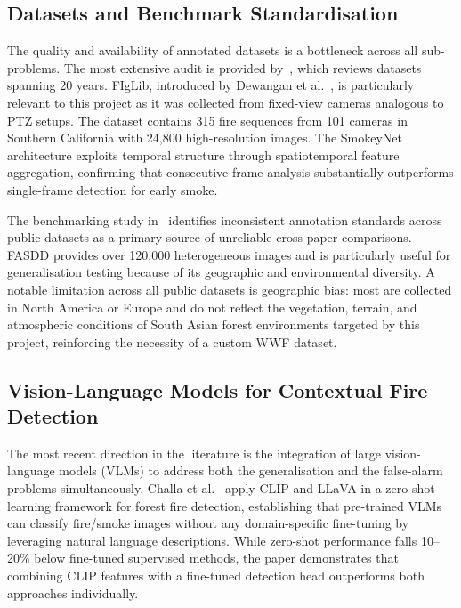 \documentclass[11pt,twocolumn]{article}
\begin{document}
\subsection{Datasets and Benchmark Standardisation}

The quality and availability of annotated datasets is a bottleneck
across all sub-problems. The most extensive audit is provided
by~\cite{datasets20years}, which reviews datasets spanning 20 years.
FIgLib, introduced by Dewangan et al.~\cite{figlib2022}, is
particularly relevant to this project as it was collected from
fixed-view cameras analogous to PTZ setups. The dataset contains
315 fire sequences from 101 cameras in Southern California with
24,800 high-resolution images. The SmokeyNet architecture exploits
temporal structure through spatiotemporal feature aggregation,
confirming that consecutive-frame analysis substantially outperforms
single-frame detection for early smoke.

The benchmarking study in~\cite{benchmarking2024} identifies
inconsistent annotation standards across public datasets as a primary
source of unreliable cross-paper comparisons. FASDD provides over
120,000 heterogeneous images and is particularly useful for
generalisation testing because of its geographic and environmental
diversity. A notable limitation across all public datasets is
geographic bias: most are collected in North America or Europe and
do not reflect the vegetation, terrain, and atmospheric conditions
of South Asian forest environments targeted by this project,
reinforcing the necessity of a custom WWF dataset.

\subsection{Vision-Language Models for Contextual Fire Detection}

The most recent direction in the literature is the integration of
large vision-language models (VLMs) to address both the generalisation
and the false-alarm problems simultaneously.
Challa et al.~\cite{clip_llava2026} apply CLIP and LLaVA in a
zero-shot learning framework for forest fire detection, establishing
that pre-trained VLMs can classify fire/smoke images without any
domain-specific fine-tuning by leveraging natural language descriptions.
While zero-shot performance falls 10--20\% below fine-tuned supervised
methods, the paper demonstrates that combining CLIP features with a
fine-tuned detection head outperforms both approaches individually.
\end{document}
